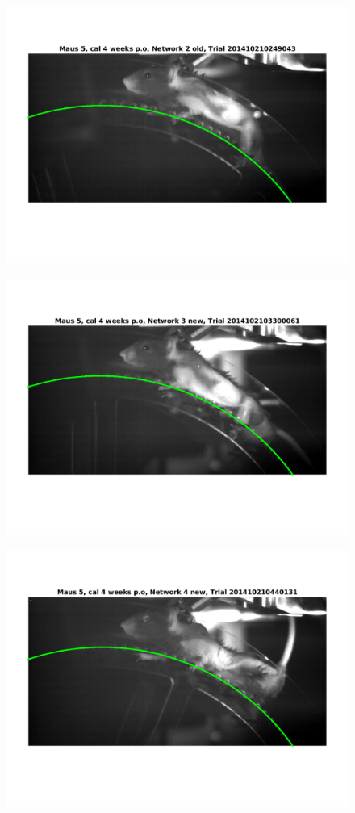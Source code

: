 \documentclass[
	fontsize=12pt,
	paper=a4,
	twoside=false,
	numbers=noenddot,
	plainheadsepline,
	toc=listof,
	toc=bibliography
]{scrartcl}
\begin{document}
\begin{figure} [htb] \centering
	\includegraphics[scale = 0.6]{images/mouse5/result_Maus_5_cal_4_weeks_Network_2_old.png}
\end{figure}
\begin{figure} [htb] \centering
	\includegraphics[scale = 0.6]{images/mouse5/result_Maus_5_cal_4_weeks_Network_3_new.png}
\end{figure}
\begin{figure} [htb] \centering
	\includegraphics[scale = 0.6]{images/mouse5/result_Maus_5_cal_4_weeks_Network_4_new.png}
\end{figure}

\FloatBarrier
\end{document}

